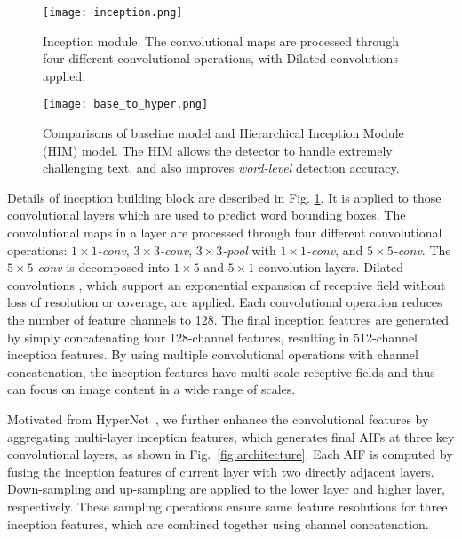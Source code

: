 \documentclass[10pt,twocolumn,letterpaper]{article}
\begin{document}
\begin{figure}
   \centering
   \texttt{[image: inception.png]}
   \caption{ Inception module. The convolutional maps are processed through four different convolutional operations, with Dilated convolutions \cite{Yu2016} applied.}
   \label{fig:inception}
\end{figure}


\begin{figure}[!t]
   \centering
  \texttt{[image: base\_to\_hyper.png]}
   \caption{Comparisons of baseline model and Hierarchical Inception Module (HIM) model. The HIM allows the detector to handle extremely challenging text, and also improves \textit{word-level} detection accuracy.}
   \label{fig:hyper}
\end{figure}

Details of inception building block are described in Fig. \ref{fig:inception}.  It is applied to  those convolutional layers which are used to predict word bounding boxes. The convolutional maps in a layer are processed through four different convolutional operations: \textit{$1\times1$-conv}, \textit{$3\times3$-conv}, \textit{$3\times3$-pool} with \textit{$1\times1$-conv}, and \textit{$5\times5$-conv}. The \textit{$5\times5$-conv} is decomposed into \textit{$1\times5$} and \textit{$5\times1$} convolution layers.  Dilated convolutions \cite{Yu2016}, which support an exponential expansion of receptive field without loss of resolution or coverage, are applied. Each convolutional operation reduces the number of feature channels to 128. The final inception features are generated by simply concatenating four 128-channel features, resulting in 512-channel inception features. 
 By using multiple convolutional operations with channel concatenation, the inception features have multi-scale receptive fields and thus can focus on image content in a wide range of scales.

Motivated from HyperNet~\cite{hariharan2015hypercolumns}, we further enhance the convolutional features by aggregating multi-layer inception features, which generates final AIFs at three key convolutional layers, as shown in Fig.~\ref{fig:architecture}. Each AIF is computed by fusing the inception features of current layer with two directly adjacent layers. Down-sampling and up-sampling are applied to the lower layer and higher layer, respectively. These sampling operations ensure same feature resolutions for three inception features, which are combined together using channel concatenation.
\end{document}
